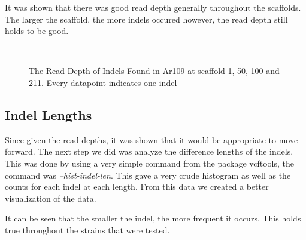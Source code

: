 \documentclass[12pt]{article}
\begin{document}
It was shown that there was good read depth generally throughout the scaffolds. The larger the scaffold, the more indels occured however, the read depth still holds to be good. 

\begin{figure}[H]
	\begin{centering}
		\\
		\begin{singlespace}
			\vspace{-0.5cm}
			\caption[The Read Depth of Indels Found]{The Read Depth of Indels Found in Ar109 at scaffold 1, 50, 100 and 211. Every datapoint indicates one indel}\label{readdepth_indel}
		\end{singlespace}
	\end{centering}
\end{figure}

\subsection{Indel Lengths}  

Since given the read depths, it was shown that it would be appropriate to move forward. The next step we did was analyze the difference lengths of the indels. This was done by using a very simple command from the package vcftools, the command was \textit{--hist-indel-len}. This gave a very crude histogram as well as the counts for each indel at each length. From this data we created a better visualization of the data. 

It can be seen that the smaller the indel, the more frequent it occurs. This holds true throughout the strains that were tested.
\end{document}
